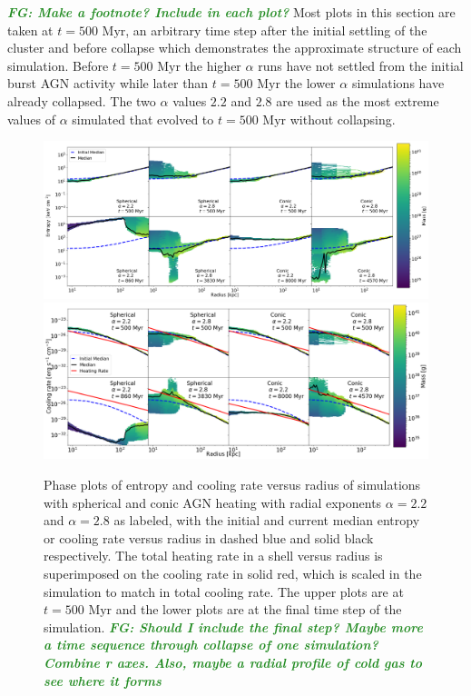 \documentclass[iop,apjl, twocolappendix]{emulateapj}   %
\def\FG#1{{\textcolor{ForestGreen}{\textbf{\textit{ FG: #1}}}}}
\begin{document}
\FG{Make a footnote? Include in each plot?} Most plots in this section are
taken at $t = 500 \text{ Myr}$, an arbitrary time step after the initial
settling of the cluster and before collapse which demonstrates the approximate
structure of each simulation. Before $t=500 \text{ Myr}$ the higher $\alpha$
runs have not settled from the initial burst AGN activity while later than
$t=500 \text{ Myr}$ the lower $\alpha$ simulations have already collapsed. The
two $\alpha$ values $2.2$ and $2.8$ are used as the most extreme values of
$\alpha$ simulated that evolved to $t= 500 \text{ Myr}$ without collapsing.

\begin{figure}
	\begin{center}
    \includegraphics[width=1\linewidth]{figures/radius_entropy_profiles}
		\includegraphics[width=1\linewidth]{figures/radius_cooling_rate_profiles}
	\end{center}
	\caption{
    \label{fig:profiles}
    Phase plots of entropy and cooling rate versus radius of simulations with
    spherical and conic AGN heating with radial exponents $\alpha=2.2$ and
    $\alpha=2.8$ as labeled, with the initial and current median entropy or
    cooling rate versus radius in dashed blue and solid black respectively. The
    total heating rate in a shell versus radius is superimposed on the cooling
    rate in solid red, which is scaled in the simulation to match in total
    cooling rate.  The upper plots are at $t= 500 \text{ Myr}$
    and the lower plots are at the final time step of the simulation.
    \FG{Should I include the final step? Maybe more a time sequence through
    collapse of one simulation? Combine r axes. Also, maybe a radial profile of
    cold gas to see where it forms}}
\end{figure}
\end{document}
